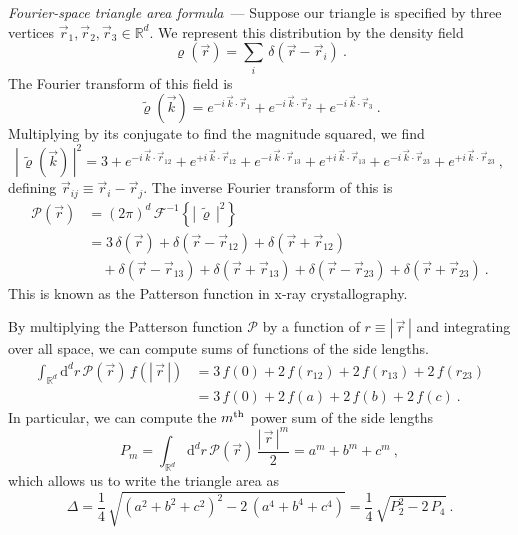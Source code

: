 \documentclass[10pt]{article}
\renewcommand{\paragraph}[1]{\par\addvspace{1em}\noindent\textsl{#1}~---}
\renewcommand{\d}{\mathrm{d}}
\newcommand{\abs}[1]{|\,{#1}\,|}
\begin{document}
\paragraph{Fourier-space triangle area formula}
Suppose our triangle is specified by three vertices $\vec{r}_1,\vec{r}_2,\vec{r}_3 \in \mathbb{R}^d$. We represent this distribution by the density field
\begin{equation}
    \varrho(\vec{r})
    = \sum_i \, \delta(\vec{r} - \vec{r}_i)~.
\end{equation}
The Fourier transform of this field is
\begin{equation}
    \tilde{\varrho}(\vec{k})
    =
    e^{-i \, \vec{k} \cdot \vec{r}_1} +
    e^{-i \, \vec{k} \cdot \vec{r}_2} +
    e^{-i \, \vec{k} \cdot \vec{r}_3}~.
\end{equation}
Multiplying by its conjugate to find the magnitude squared, we find
\begin{equation}
    \abs{\tilde{\varrho}(\vec{k})}^2
    =
    3 +
    e^{-i \, \vec{k} \cdot \vec{r}_{12}} +
    e^{+i \, \vec{k} \cdot \vec{r}_{12}} +
    e^{-i \, \vec{k} \cdot \vec{r}_{13}} +
    e^{+i \, \vec{k} \cdot \vec{r}_{13}} +
    e^{-i \, \vec{k} \cdot \vec{r}_{23}} +
    e^{+i \, \vec{k} \cdot \vec{r}_{23}}~,
\end{equation}
defining $\vec{r}_{ij} \equiv \vec{r}_i - \vec{r}_j$.
The inverse Fourier transform of this is
\begin{align}
    \mathcal{P}(\vec{r})
    &= (2\pi)^d \, \mathcal{F}^{-1} \! \left\{ \abs{\tilde{\varrho}}^2 \right\}
    \nonumber\\ 
    &= 3 \,\delta(\vec{r})
    + \delta(\vec{r} - \vec{r}_{12})
    + \delta(\vec{r} + \vec{r}_{12})
    \nonumber\\
    &\quad + \delta(\vec{r} - \vec{r}_{13})
    + \delta(\vec{r} + \vec{r}_{13})
    + \delta(\vec{r} - \vec{r}_{23})
    + \delta(\vec{r} + \vec{r}_{23})~.
\end{align}
This is known as the Patterson function in x-ray crystallography.

By multiplying the Patterson function $\mathcal{P}$ by a function of $r \equiv \abs{\vec{r}}$ and integrating over all space, we can compute sums of functions of the side lengths.
\begin{align}
    \int_{\mathbb{R}^d} \d^d r \, \mathcal{P}(\vec{r}) \, f(\abs{\vec{r}})
    &= 3 \, f(0) +
        2 \, f(r_{12}) +
        2 \, f(r_{13}) +
        2 \, f(r_{23}) \nonumber\\
    &= 3 \, f(0) +
        2 \, f(a) +
        2 \, f(b) +
        2 \, f(c)~.
\end{align}
In particular, we can compute the $m^{\rm th}$ power sum of the side lengths
\begin{equation}
    P_m
    = \int_{\mathbb{R}^d} \d^d r \, \mathcal{P}(\vec{r}) \, \frac{\abs{\vec{r}}^m}{2}
    = a^m + b^m + c^m~,
\end{equation}
which allows us to write the triangle area as
\begin{equation}
    \Delta
    = \frac{1}{4} \, \sqrt{\left(a^2+b^2+c^2\right)^2 - 2\, \left(a^4+b^4+c^4\right)}
    = \frac{1}{4} \, \sqrt{P_2^2 - 2\, P_4}~.
\end{equation}
\end{document}
